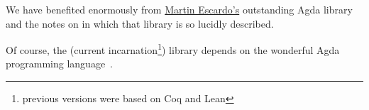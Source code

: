\documentclass[a4paper,USenglish,cleveref,autoref,thm-restate]{lipics-v2019}
\begin{document}
We have benefited enormously from \href{https://www.cs.bham.ac.uk/~mhe}{Martin Escardo's} outstanding \typetopology Agda library and the notes on \hottufinagda in which that library is so lucidly described.

Of course, the (current incarnation\footnote{previous versions were based on Coq and Lean}) \agdaualib library depends on the wonderful Agda programming language~\cite{Norell:2009}.









\end{document}
